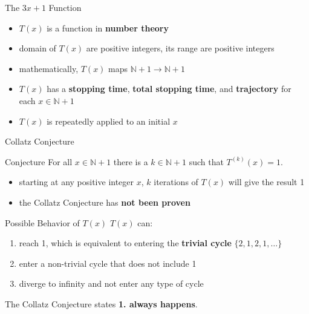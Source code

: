 \documentclass[hyperref={colorlinks,allcolors=black}]{beamer}
\begin{document}
\begin{frame}{The $3x+1$ Function}
\begin{itemize}
    \item $T(x)$ is a function in \textbf{number theory} \cite{src:chamberland}
    \item domain of $T(x)$ are positive integers, its range are positive 
        integers
    \item mathematically, 
        $T(x)$ maps $\mathbb{N} + 1 \rightarrow \mathbb{N} + 1$ \cite{src:tao}
    \item $T(x)$ has a \textbf{stopping time}, \textbf{total stopping 
        time}, and \textbf{trajectory} for each $x \in \mathbb{N} + 1$
        \cite{src:lagarias}
    \item $T(x)$ is repeatedly applied to an initial $x$
\end{itemize}
\end{frame}


\begin{frame}{Collatz Conjecture}
\begin{block}{Conjecture}
For all $x \in \mathbb{N} + 1$ there is a $k \in \mathbb{N} + 1$ such that
$T^{(k)}(x)=1$.
\end{block}

\begin{itemize}
    \item starting at any positive integer $x$, $k$ iterations of $T(x)$ will 
        give the result 1 \cite{src:lagarias}
    \item the Collatz Conjecture has \textbf{not been proven} 
        \cite{src:lagarias}
\end{itemize}
\end{frame}


\begin{frame}{Possible Behavior of $T(x)$}
$T(x)$ can:
\begin{enumerate}
    \item reach 1, which is equivalent to entering the \textbf{trivial cycle} 
        $\{2,1,2,1,\dots\}$
    \item enter a non-trivial cycle that does not include 1
    \item diverge to infinity and not enter any type of cycle
\end{enumerate}
    The Collatz Conjecture states \textbf{1. always happens}.
    \cite{src:chamberland}
\end{frame}
\end{document}
